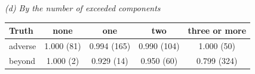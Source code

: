 \begin{table}[htbp]
\medskip
\textit{(d) By the number of exceeded components}\\[2pt]
\begin{tabular*}{\textwidth}{@{\extracolsep{\fill}}lcccc@{}}
\toprule
Truth & none & one & two & three or more \\
\midrule
adverse & 1.000 (81) & 0.994 (165) & 0.990 (104) & 1.000 (50) \\
beyond & 1.000 (2) & 0.929 (14) & 0.950 (60) & 0.799 (324) \\
\bottomrule
\end{tabular*}
\end{table}
